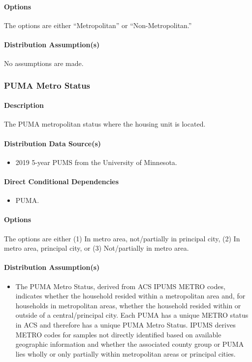 \paragraph{Options}
The options are either ``Metropolitan'' or ``Non-Metropolitan.''

\paragraph{Distribution Assumption(s)}
No assumptions are made.


\subsubsection{PUMA Metro Status}
\paragraph{Description}
The PUMA metropolitan status where the housing unit is located.

\paragraph{Distribution Data Source(s)}
\begin{itemize}
    \item 2019 5-year PUMS from the University of Minnesota.
\end{itemize}

\paragraph{Direct Conditional Dependencies}
\begin{itemize}
    \item PUMA.
\end{itemize}

\paragraph{Options}
The options are either (1) In metro area, not/partially in principal city, (2) In metro area, principal city, or (3) Not/partially in metro area. 

\paragraph{Distribution Assumption(s)}
\begin{itemize}
    \item The PUMA Metro Status, derived from ACS IPUMS METRO codes, indicates whether the household resided within a metropolitan area and, for households in metropolitan areas, whether the household resided within or outside of a central/principal city. Each PUMA has a unique METRO status in ACS and therefore has a unique PUMA Metro Status. IPUMS derives METRO codes for samples not directly identified based on available geographic information and whether the associated county group or PUMA lies wholly or only partially within metropolitan areas or principal cities.
\end{itemize}

